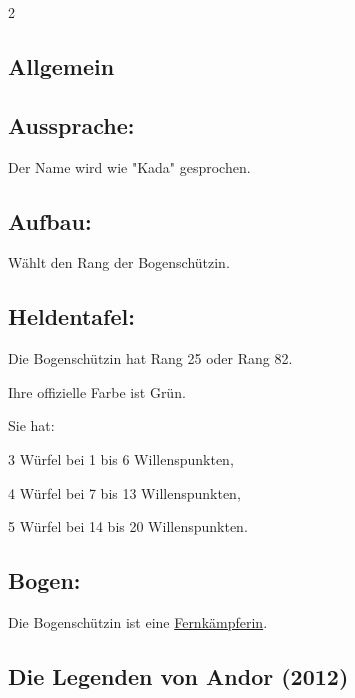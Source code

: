 \documentclass[10pt, a4paper, oneside]{book}
\begin{document}
\begin{multicols*}{2}\raggedcolumns


\begin{nobgcolor}

\section{Allgemein}

\subsection{Aussprache:}


Der Name wird wie "Kada" gesprochen.
\supercite{26518,33469}




\subsection{Aufbau:}

Wählt den Rang der Bogenschützin.



\subsection{Heldentafel:}

Die Bogenschützin hat Rang 25 oder Rang 82.

Ihre offizielle Farbe ist Grün.

Sie hat:

\bullet{} 3 Würfel bei 1 bis 6 Willenspunkten,

\bullet{} 4 Würfel bei 7 bis 13 Willenspunkten,

\bullet{} 5 Würfel bei 14 bis 20 Willenspunkten.




\subsection{Bogen:}

Die Bogenschützin ist eine \hyperref[fernkaempfer]{Fernkämpferin}.



\end{nobgcolor}


\begin{bgcolor}
\section{Die Legenden von Andor (2012)}



\end{bgcolor}
\end{multicols*}
\end{document}

